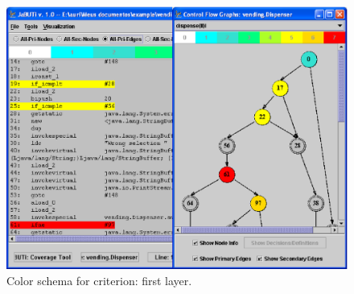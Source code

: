 \begin{figure}[!ht]
\begin{center}
\includegraphics[height=0.40\textheight]{fig/decision-layer1.eps}
\caption{\label{fig:decision-color} Color schema for
 criterion: first layer.}
\end{center}
\end{figure}
